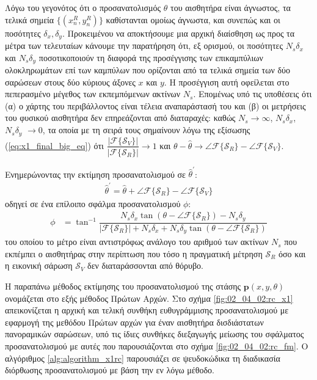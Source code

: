 Λόγω του γεγονότος ότι ο προσανατολισμός $\theta$ του αισθητήρα είναι άγνωστος,
τα τελικά σημεία $\{(x_n^R,y_n^R)\}$ καθίστανται ομοίως άγνωστα, και συνεπώς
και οι ποσότητες $\delta_x, \delta_y$. Προκειμένου να αποκτήσουμε μια αρχική
διαίσθηση ως προς τα μέτρα των τελευταίων κάνουμε την παρατήρηση ότι, εξ
ορισμού, οι ποσότητες $N_s \delta_x$ και $N_s \delta_y$ ποσοτικοποιούν τη
διαφορά της προσέγγισης των επικαμπύλιων ολοκληρωμάτων επί των καμπύλων που
ορίζονται από τα τελικά σημεία των δύο σαρώσεων στους δύο κύριους άξονες $x$
και $y$.  Η προσέγγιση αυτή οφείλεται στο πεπερασμένο μέγεθος των εκπεμπόμενων
ακτίνων $N_s$. Επομένως υπό τις υποθέσεις ότι (α) ο χάρτης του περιβάλλοντος
είναι τέλεια αναπαράστασή του και (β) οι μετρήσεις του φυσικού αισθητήρα δεν
επηρεάζονται από διαταραχές: καθώς $N_s \rightarrow \infty$, $N_s \delta_x$,
$N_s \delta_y$ $\rightarrow 0$, τα οποία με τη σειρά τους σημαίνουν λόγω της
εξίσωσης (\ref{eq:x1_final_big_eq}) ότι
$\dfrac{|\mathcal{F}\{\mathcal{S}_V\}|}{|\mathcal{F}\{\mathcal{S}_R\}|}
\rightarrow 1$ και $\theta-\hat{\theta} \rightarrow \angle
\mathcal{F}\{\mathcal{S}_R\} - \angle \mathcal{F}\{\mathcal{S}_V\}$.

\begin{gg_box}
\begin{remark}
  Ενημερώνοντας την εκτίμηση προσανατολισμού σε $\hat{\theta}^\prime$:
  \begin{align}
  \hat{\theta}^\prime = \hat{\theta} + \angle \mathcal{F}\{\mathcal{S}_R\} - \angle\mathcal{F}\{\mathcal{S}_V\}
    \label{eq:update_t2}
  \end{align}
  οδηγεί σε ένα επίλοιπο σφάλμα προσανατολισμού $\phi$:
  \begin{align}
    \phi &= \tan^{-1}\dfrac{N_s \delta_x \tan(\theta - \angle \mathcal{F}\{\mathcal{S}_R\}) - N_s \delta_y}{|\mathcal{F}\{\mathcal{S}_R\}| + N_s \delta_x + N_s \delta_y \tan(\theta - \angle \mathcal{F}\{\mathcal{S}_R\})} \label{eq:phi2}
  \end{align}
  του οποίου το μέτρο είναι αντιστρόφως ανάλογο του αριθμού των ακτίνων $N_s$ που
  εκπέμπει ο αισθητήρας στην περίπτωση που τόσο η πραγματική μέτρηση
  $\mathcal{S}_R$ όσο και η εικονική σάρωση $\mathcal{S}_V$ δεν διαταράσσονται
  από θόρυβο.
  \label{remark:02_04_02:02}
\end{remark}
\end{gg_box}

Η παραπάνω μέθοδος εκτίμησης του προσανατολισμού της στάσης
$\bm{p}(x,y,\theta)$ ονομάζεται στο εξής μέθοδος Πρώτων Αρχών.  Στο σχήμα
\ref{fig:02_04_02:rc_x1} απεικονίζεται η αρχική και τελική συνθήκη
ευθυγράμμισης προσανατολισμού με εφαρμογή της μεθόδου Πρώτων αρχών για έναν
αισθητήρα δισδιάστατων πανοραμικών σαρώσεων, υπό τις ίδιες συνθήκες διεξαγωγής
μείωσης του σφάλματος προσανατολισμού με αυτές που παρουσιάζονται στο σχήμα
\ref{fig:02_04_02:rc_fm}. Ο αλγόριθμος \ref{alg:algorithm_x1rc} παρουσιάζει σε
ψευδοκώδικα τη διαδικασία διόρθωσης προσανατολισμού με βάση την εν λόγω μέθοδο.

